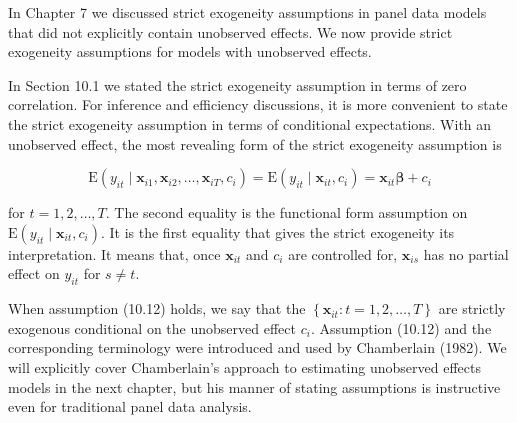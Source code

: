 \documentclass[10pt]{article}
\begin{document}
In Chapter 7 we discussed strict exogeneity assumptions in panel data models that did not explicitly contain unobserved effects. We now provide strict exogeneity assumptions for models with unobserved effects.

In Section 10.1 we stated the strict exogeneity assumption in terms of zero correlation. For inference and efficiency discussions, it is more convenient to state the strict exogeneity assumption in terms of conditional expectations. With an unobserved effect, the most revealing form of the strict exogeneity assumption is


\begin{equation*}
\mathrm{E}\left(y_{i t} \mid \mathbf{x}_{i 1}, \mathbf{x}_{i 2}, \ldots, \mathbf{x}_{i T}, c_{i}\right)=\mathrm{E}\left(y_{i t} \mid \mathbf{x}_{i t}, c_{i}\right)=\mathbf{x}_{i t} \boldsymbol{\beta}+c_{i} \tag{10.12}
\end{equation*}


for $t=1,2, \ldots, T$. The second equality is the functional form assumption on $\mathrm{E}\left(y_{i t} \mid \mathbf{x}_{i t}, c_{i}\right)$. It is the first equality that gives the strict exogeneity its interpretation. It means that, once $\mathbf{x}_{i t}$ and $c_{i}$ are controlled for, $\mathbf{x}_{i s}$ has no partial effect on $y_{i t}$ for $s \neq t$.

When assumption (10.12) holds, we say that the $\left\{\mathbf{x}_{i t}: t=1,2, \ldots, T\right\}$ are strictly exogenous conditional on the unobserved effect $c_{i}$. Assumption (10.12) and the corresponding terminology were introduced and used by Chamberlain (1982). We will explicitly cover Chamberlain's approach to estimating unobserved effects models in the next chapter, but his manner of stating assumptions is instructive even for traditional panel data analysis.
\end{document}

